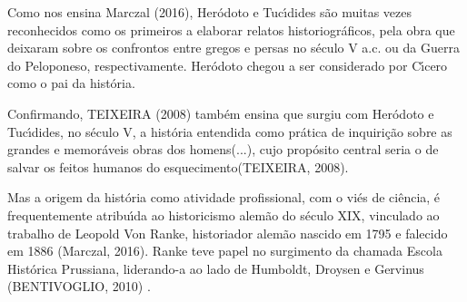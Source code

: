 \documentclass[
12pt,		%
openright,	%
twoside,  %
a4paper,			%
chapter=TITLE,		%
english,			%
french,				%
spanish,			%
brazil				%
]{USPSC-classe/USPSC}
\begin{document}
Como nos ensina  Marczal (2016),  Her\'odoto e Tuc\'{\i}dides s\~ao muitas vezes reconhecidos como os primeiros a elaborar relatos historiogr\'aficos, pela obra que deixaram sobre os confrontos entre gregos e persas no s\'eculo V a.c. ou da Guerra do Peloponeso, respectivamente. Her\'odoto chegou a ser considerado por C\'{\i}cero como o \textquotedbl pai da hist\'oria\textquotedbl .








Confirmando, TEIXEIRA (2008)  tamb\'em ensina que surgiu com Her\'odoto e Tuc\'{\i}dides, no s\'eculo V, a hist\'oria \textquotedbl entendida como pr\'atica de inquiri\c{c}\~ao sobre as grandes e memor\'aveis obras dos homens(...), cujo prop\'osito central seria o de salvar os feitos humanos do esquecimento\textquotedbl   (TEIXEIRA, 2008).








Mas a origem da hist\'oria como atividade profissional, com o vi\'es de ci\^encia, \'e frequentemente atribu\'{\i}da ao historicismo alem\~ao do s\'eculo XIX, vinculado ao trabalho de Leopold Von Ranke, historiador alem\~ao nascido em 1795 e falecido em 1886 (Marczal, 2016). Ranke teve papel no surgimento da chamada Escola Hist\'orica Prussiana, liderando-a ao lado de Humboldt, Droysen e Gervinus  (BENTIVOGLIO, 2010) .
\end{document}
